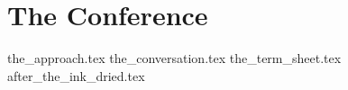 \part{The Conference}


{the_approach.tex}
{the_conversation.tex}
{the_term_sheet.tex}
{after_the_ink_dried.tex}